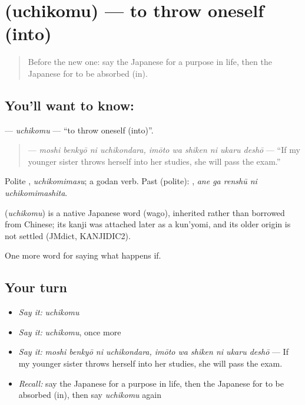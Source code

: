 \section[\texorpdfstring{\ja{うちこむ} (uchikomu)}{うちこむ (uchikomu)}]{ (uchikomu) — to throw oneself (into)}

\label{lesson:JA-C533-uchikomu}



\begin{quote}
Before the new one: say the Japanese for a purpose in life, then the Japanese for to be absorbed (in).
\end{quote}

\subsection*{You'll want to know: }
\textbf{} — \emph{uchikomu} — \textquotedblleft{}to throw oneself (into)\textquotedblright{}.

\begin{quote}
\textbf{    } — \emph{moshi benkyō ni uchikondara, imōto wa shiken ni ukaru deshō} — \textquotedblleft{}If my younger sister throws herself into her studies, she will pass the exam.\textquotedblright{}
\end{quote}

Polite \textbf{}, \emph{uchikomimasu}; a godan verb. Past (polite): \textbf{  }, \emph{ane ga renshū ni uchikomimashita}.

\begin{cousinweb}
\textbf{} (\emph{uchikomu}) is a native Japanese word (wago), inherited rather than borrowed from Chinese; its kanji was attached later as a kun'yomi, and its older origin is not settled (JMdict, KANJIDIC2).
\end{cousinweb}

\begin{grammarlens}[title={What you've built}]
One more word for saying what happens if.
\end{grammarlens}

\subsection*{Your turn}
\begin{itemize}
\raggedright
  \item \emph{Say it:} \emph{uchikomu}
  \item \emph{Say it:} \emph{uchikomu}, once more
  \item \emph{Say it:} \emph{moshi benkyō ni uchikondara, imōto wa shiken ni ukaru deshō} — If my younger sister throws herself into her studies, she will pass the exam.
  \item \emph{Recall:} say the Japanese for a purpose in life, then the Japanese for to be absorbed (in), then say \emph{uchikomu} again
\end{itemize}


